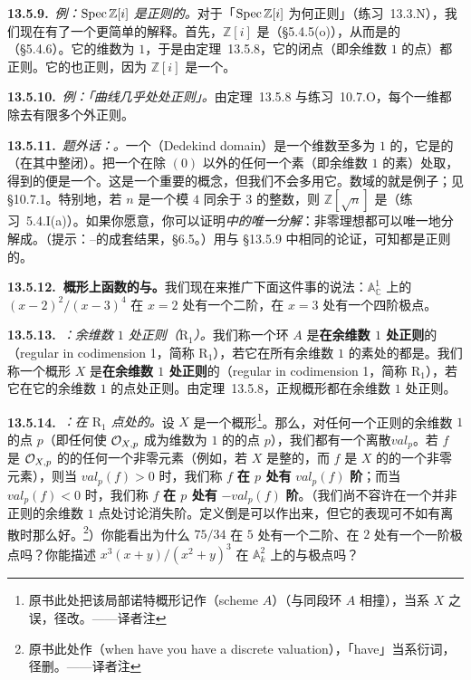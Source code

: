 \textbf{13.5.9.}\ \emph{例：$\operatorname{Spec}\mathbb{Z}[i]$ 是正则的。}\quad 对于「$\operatorname{Spec}\mathbb{Z}[i]$ 为何正则」（\mbox{练习~13.3.N}），我们现在有了一个更简单的解释。首先，$\mathbb{Z}[i]$ 是\trUFD（\S5.4.5(o)），从而是\trNormal{}的（\S5.4.6）。它的维数为 $1$，于是由定理~13.5.8，它的闭点（即余维数 $1$ 的点）都正则。它的\trGenericPoint{}也正则，因为 $\mathbb{Z}[i]$ 是一个\trIntegralDomain。

\textbf{13.5.10.}\ \emph{例：「曲线几乎处处正则」。}\quad 由定理~13.5.8 与\mbox{练习~10.7.O}，每个一维\trVariety{}都除去有限多个\trClosedPoint{}外正则。

\textbf{13.5.11.}\ \emph{题外话：\trDedekindDomain。}\quad 一个\textbf{\trDedekindDomain}（Dedekind domain）是一个维数至多为 $1$ 的\trNoetherian\trIntegralDomain，它是\trNormal{}的（在其\trFractionField{}中整闭）。把一个\trDedekindDomain{}在除 $(0)$ 以外的任何一个素（即余维数 $1$ 的素）处取\trLocalization，得到的便是一个\trDVR。这是一个重要的概念，但我们不会多用它。数域的\trRingOfIntegers{}就是例子；见 \S10.7.1。特别地，若 $n$ 是一个模 $4$ 同余于 $3$ 的\trSquareFree{}整数，则 $\mathbb{Z}[\sqrt{n}]$ 是\trDedekindDomain（\mbox{练习~5.4.I(a)}）。如果你愿意，你可以证明\emph{\trDedekindDomain{}中\trIdeal{}的唯一分解}：非零理想都可以唯一地分解成\trPrimeIdeal。（提示：\trJordan--\trHolder{}的成套结果，\S6.5。）用与 \S13.5.9 中相同的论证，可知\trDedekindDomain{}都是正则的。

\textbf{13.5.12.\ \trNoetherian{}概形上函数的\trZeros{}与\trPole。}\quad 我们现在来推广下面这件事的说法：$\mathbb{A}^1_\mathbb{C}$ 上的 $(x-2)^2/(x-3)^4$ 在 $x=2$ 处有一个二阶\trZeros，在 $x=3$ 处有一个四阶极点。

\textbf{13.5.13.}\ \emph{\trhDefinition{}：余维数 $1$ 处正则（$\mathrm{R}_1$）。}\quad 我们称一个\trNoetherian{}环 $A$ 是\textbf{在余维数 $1$ 处正则}的（regular in codimension 1，简称 $\mathrm{R}_1$），若它在所有余维数 $1$ 的素处的\trLocalization{}都是\trRegular\trLocalRing。我们称一个\trLocally\trNoetherian{}概形 $X$ 是\textbf{在余维数 $1$ 处正则}的（regular in codimension 1，简称 $\mathrm{R}_1$），若它在它的余维数 $1$ 的点处正则。由定理~13.5.8，\trNoetherian{}正规概形都在余维数 $1$ 处正则。

\textbf{13.5.14.}\ \emph{\trhDefinition{}：在 $\mathrm{R}_1$ 点处的\trValuation。}\quad 设 $X$ 是一个\trLocally\trNoetherian{}概形\footnote{原书此处把该局部诺特概形记作（scheme $A$）（与同段环 $A$ 相撞），当系 $X$ 之误，径改。——译者注}。那么，对任何一个正则的余维数 $1$ 的点 $p$（即任何使 $\mathcal{O}_{X,p}$ 成为维数为 $1$ 的\trRegular\trLocalRing{}的点 $p$），我们都有一个离散\trValuation $\mathit{val}_p$。若 $f$ 是 $\mathcal{O}_{X,p}$ 的\trFractionField{}的任何一个非零元素（例如，若 $X$ 是整的，而 $f$ 是 $X$ 的\trFunctionField{}的一个非零元素），则当 $\mathit{val}_p(f)>0$ 时，我们称 $f$ \textbf{在 $p$ 处有} $\mathit{val}_p(f)$ \textbf{阶\trZeros}；而当 $\mathit{val}_p(f)<0$ 时，我们称 $f$ \textbf{在 $p$ 处有} $-\mathit{val}_p(f)$ \textbf{阶\trPole}。（我们尚不容许在一个并非正则的余维数 $1$ 点处讨论消失阶。定义倒是可以作出来，但它的表现可不如有离散\trValuation{}时那么好。\footnote{原书此处作（when have you have a discrete valuation），「have」当系衍词，径删。——译者注}）你能看出为什么 $75/34$ 在 $5$ 处有一个二阶\trZeros、在 $2$ 处有一个一阶极点吗？你能描述 $x^3(x+y)/(x^2+y)^3$ 在 $\mathbb{A}^2_k$ 上的\trZeros{}与极点吗？

